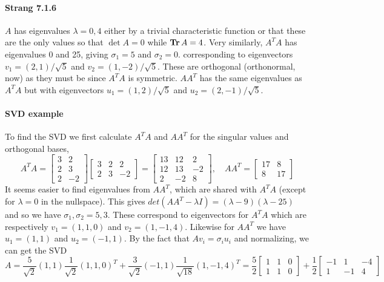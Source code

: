 \documentclass[10pt]{scrartcl}
\newcommand{\Tr}{\mathop{\bf Tr}}
\begin{document}
\paragraph{Strang 7.1.6}
$A$ has eigenvalues $\lambda=0,4$ either by a trivial characteristic function or that these are the only values so that $\det{A}=0$ while $\Tr{A}=4$. Very similarly, $A^T A$ has eigenvalues 0 and 25, giving $\sigma_1=5$ and $\sigma_2=0$. corresponding to eigenvectors   $v_1=(2,1)/\sqrt{5}$ and $v_2 = (1,-2)/\sqrt{5}$. These are orthogonal (orthonormal, now) as they must be since $A^T A$ is symmetric. $AA^T$ has the same eigenvalues as $A^T A$ but with eigenvectors $u_1=(1,2)/\sqrt{5}$ and $u_2=(2,-1)/\sqrt{5}$.

\paragraph{SVD example} To find the SVD we first calculate $A^T A$ and $A A^T$ for the singular values and orthogonal bases,
\[A^T A = \begin{bmatrix}3& 2\\2& 3\\2&-2\end{bmatrix}\begin{bmatrix}3&2&2\\2&3&-2\end{bmatrix} = \begin{bmatrix}13&12&2\\12&13&-2\\2&-2&8\end{bmatrix},\quad A A^T = \begin{bmatrix}17&8\\8&17\end{bmatrix}\]
It seems easier to find eigenvalues from $A A^T$, which are shared with $A^T A$ (except for $\lambda=0$ in the nullspace). This gives $det{(AA^T - \lambda I)} = (\lambda-9)(\lambda-25)$ and so we have $\sigma_1, \sigma_2 = 5,3$.  These correspond to eigenvectors for $A^T A$ which are respectively $v_1=(1,1,0)$ and $v_2=(1,-1,4)$. Likewise for $A A^T$ we have $u_1 = (1,1)$ and $u_2 = (-1, 1)$. By the fact that $Av_i = \sigma_i u_i$ and normalizing, we can get the SVD
\[A= \frac{5}{\sqrt{2}}(1,1)\frac{1}{\sqrt{2}}(1,1,0)^T + \frac{3}{\sqrt{2}}(-1,1)\frac{1}{\sqrt{18}}(1,-1,4)^T = \frac{5}{2}\begin{bmatrix}1&1&0\\1&1&0\end{bmatrix}+\frac{1}{2}\begin{bmatrix}-1&1&-4\\1&-1&4\end{bmatrix}\]
\end{document}
